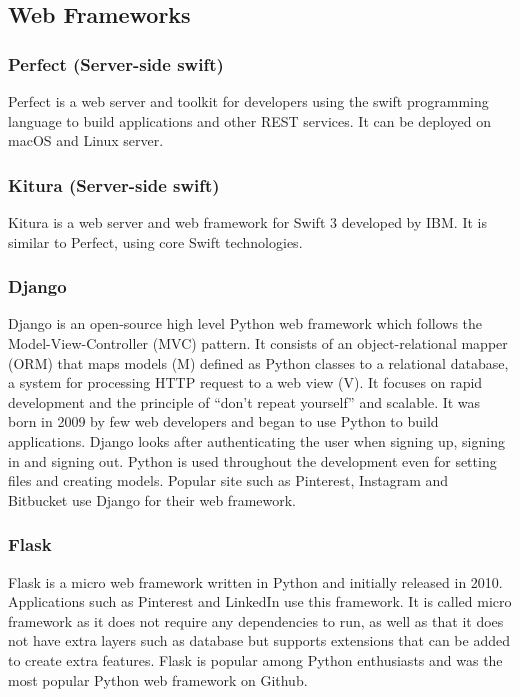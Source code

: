 \subsection{Web Frameworks}

\subsubsection{Perfect (Server-side swift)}
Perfect \cite{perfect} is a web server and toolkit for developers using the swift programming language to build applications and other REST services. It can be deployed on macOS and Linux server.

\subsubsection{Kitura (Server-side swift)}
Kitura \cite{kitura} is a web server and web framework for Swift 3 developed by IBM. It is similar to Perfect, using core Swift technologies.

\subsubsection{Django}
Django \cite{django} is an open-source  high level Python web framework which follows the Model-View-Controller (MVC) pattern.  It consists of an object-relational mapper (ORM) that maps models (M)  defined as Python classes to a relational database, a system for processing  HTTP request to a web view (V).  It focuses on rapid development and the principle of  “don’t repeat yourself” and scalable. It was born in 2009 by few web developers and began to use Python to build applications. Django looks after authenticating the user when signing up, signing in and signing out. Python is used throughout the development even for setting files and creating models. Popular site such as Pinterest, Instagram and Bitbucket use Django for their web framework.

\subsubsection{Flask}
Flask \cite{flask} is a micro web framework written in Python and initially released in 2010. Applications such as Pinterest and LinkedIn use this framework. It is called micro framework as it does not require any dependencies to run, as well as that it does not have extra layers such as database but supports extensions that can be added to create extra features. Flask is popular among Python enthusiasts and was the most popular Python web framework on Github.

